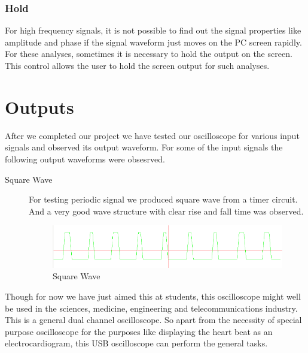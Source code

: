 \documentclass[12pt,a4paper]{article}
\begin{document}
\subsubsection{Hold}
For high frequency signals, it is not possible to find out the signal properties like amplitude and phase if the signal waveform just moves on the PC screen rapidly. For these analyses, sometimes it is necessary to hold the output on the screen.  This control allows the user to hold the screen output for such analyses.


\section{Outputs}
After we completed our project we have tested our oscilloscope for various input signals and observed its output waveform. For some of the input signals the following output waveforms were obsesrved.

\begin{description}
	\item[Square Wave] For testing periodic signal we produced square wave from a timer circuit. And a very good wave structure with clear rise and fall time was observed.
	\begin{figure}[hpbt]
		\centering
		\includegraphics[scale=.5]{./Images/OutputOne.png}
		\caption{Square Wave}
		\label{fig:SquareWave}
\end{figure}				
\end{description}

%


Though for now we have just aimed this at students, this oscilloscope might well be used in the sciences, medicine, engineering and telecommunications industry.  This is a general dual channel oscilloscope. So apart from the necessity of special purpose oscilloscope for the purposes like displaying the heart beat as an electrocardiogram, this USB oscilloscope can perform the general tasks.
\end{document}
